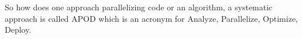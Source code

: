 So how does one approach parallelizing code or an algorithm, a systematic approach is called APOD which is an acronym for Analyze, Parallelize, Optimize, Deploy.
